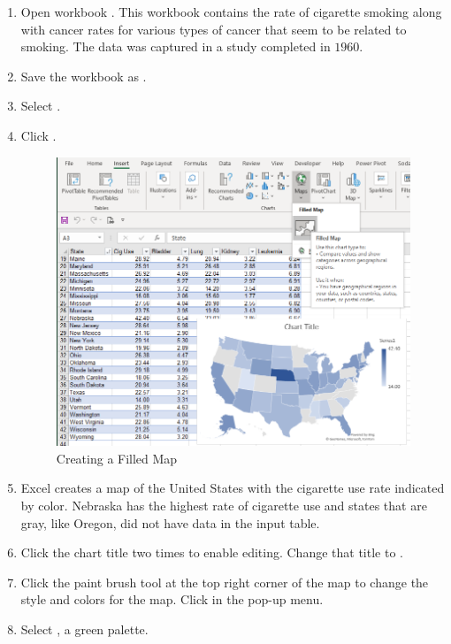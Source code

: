 \begin{enumbox}
	\begin{enumerate}
		\item Open workbook . This workbook contains the rate of cigarette smoking along with cancer rates for various types of cancer that seem to be related to smoking. The data was captured in a study completed in $ 1960 $.
		\item Save the workbook as .
		\item Select .
		\item Click .

		\begin{figure}[H]
			\centering
			\includegraphics[width=\maxwidth{.95\linewidth}]{gfx/ch08_fig90}
			\caption{Creating a Filled Map}
			\label{08:fig90}
		\end{figure}

		\item Excel creates a map of the United States with the cigarette use rate indicated by color. Nebraska has the highest rate of cigarette use and states that are gray, like Oregon, did not have data in the input table.
		\item Click the chart title two times to enable editing. Change that title to .
		\item Click the paint brush tool at the top right corner of the map to change the style and colors for the map. Click  in the pop-up menu.
		\item Select , a green palette.


\end{enumerate}
\end{enumbox}
